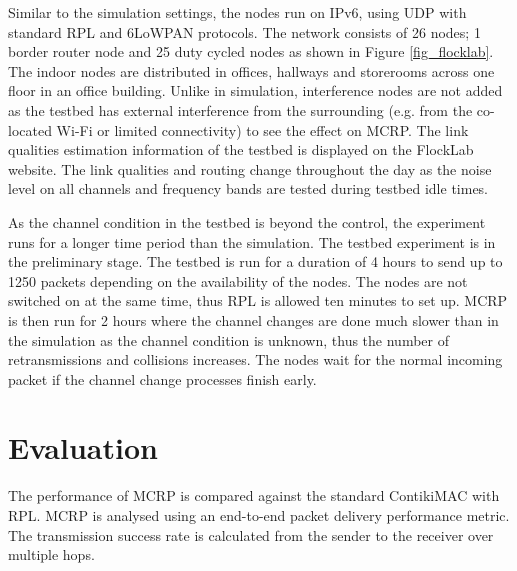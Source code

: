 Similar to the simulation settings, the nodes run on IPv6, using UDP with standard RPL and 6LoWPAN protocols. The network consists of 26 nodes; 1 border router node and 25 duty cycled nodes as shown in Figure \ref{fig_flocklab}. The indoor nodes are distributed in offices, hallways and storerooms across one floor in an office building. Unlike in simulation, interference nodes are not added as the testbed has external interference from the surrounding (e.g. from the co-located Wi-Fi or limited connectivity) to see the effect on MCRP. The link qualities estimation information of the testbed is displayed on the FlockLab website. The link qualities and routing change throughout the day as the noise level on all channels and frequency bands are tested during testbed idle times.

As the channel condition in the testbed is beyond the control, the experiment runs for a longer time period than the simulation. The testbed experiment is in the preliminary stage. The testbed is run for a duration of 4 hours to send up to 1250 packets depending on the availability of the nodes. The nodes are not switched on at the same time, thus RPL is allowed ten minutes to set up. MCRP is then run for 2 hours where the channel changes are done much slower than in the simulation as the channel condition is unknown, thus the number of retransmissions and collisions increases. The nodes wait for the normal incoming packet if the channel change processes finish early.


\section{Evaluation}
The performance of MCRP is compared against the standard ContikiMAC with RPL. MCRP is analysed using an end-to-end packet delivery performance metric. The transmission success rate is calculated from the sender to the receiver over multiple hops. 

